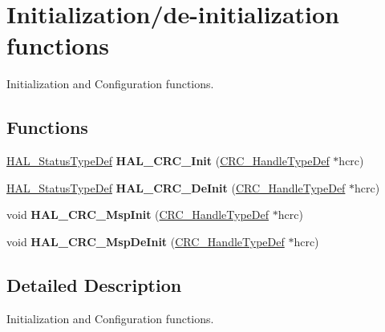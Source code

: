 \hypertarget{group___c_r_c___exported___functions___group1}{}\section{Initialization/de-\/initialization functions}
\label{group___c_r_c___exported___functions___group1}


Initialization and Configuration functions.  


\subsection*{Functions}
\begin{DoxyCompactItemize}
\item 
\mbox{\label{group___c_r_c___exported___functions___group1_ga23e7df2eaecf59615e13b2cad8b7185f}} 
\hyperlink{stm32f0xx__hal__def_8h_a63c0679d1cb8b8c684fbb0632743478f}{H\+A\+L\+\_\+\+Status\+Type\+Def} {\bfseries H\+A\+L\+\_\+\+C\+R\+C\+\_\+\+Init} (\hyperlink{struct_c_r_c___handle_type_def}{C\+R\+C\+\_\+\+Handle\+Type\+Def} $\ast$hcrc)
\item 
\mbox{\label{group___c_r_c___exported___functions___group1_gac600b9a1785f2372ca40ed5449c23739}} 
\hyperlink{stm32f0xx__hal__def_8h_a63c0679d1cb8b8c684fbb0632743478f}{H\+A\+L\+\_\+\+Status\+Type\+Def} {\bfseries H\+A\+L\+\_\+\+C\+R\+C\+\_\+\+De\+Init} (\hyperlink{struct_c_r_c___handle_type_def}{C\+R\+C\+\_\+\+Handle\+Type\+Def} $\ast$hcrc)
\item 
\mbox{\label{group___c_r_c___exported___functions___group1_ga5167ffd293de5d86f5873910416b36d0}} 
void {\bfseries H\+A\+L\+\_\+\+C\+R\+C\+\_\+\+Msp\+Init} (\hyperlink{struct_c_r_c___handle_type_def}{C\+R\+C\+\_\+\+Handle\+Type\+Def} $\ast$hcrc)
\item 
\mbox{\label{group___c_r_c___exported___functions___group1_gac19b8df939b3490e690bdf1e1e04ead3}} 
void {\bfseries H\+A\+L\+\_\+\+C\+R\+C\+\_\+\+Msp\+De\+Init} (\hyperlink{struct_c_r_c___handle_type_def}{C\+R\+C\+\_\+\+Handle\+Type\+Def} $\ast$hcrc)
\end{DoxyCompactItemize}


\subsection{Detailed Description}
Initialization and Configuration functions. 

